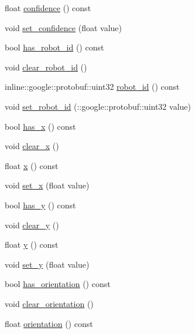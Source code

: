 \begin{DoxyCompactItemize}
\item 
float \hyperlink{class_s_s_l___detection_robot_a1d97bf539ab936970b87ef7227901244}{confidence} () const 
\item 
void \hyperlink{class_s_s_l___detection_robot_ad88046c782a1adaf687615e34f3e2872}{set\-\_\-confidence} (float value)
\item 
bool \hyperlink{class_s_s_l___detection_robot_a34dd202d20152a26ab7fd5260de88396}{has\-\_\-robot\-\_\-id} () const 
\item 
void \hyperlink{class_s_s_l___detection_robot_a0922ff5871a2a6c71b8ec5ad930418a4}{clear\-\_\-robot\-\_\-id} ()
\item 
inline\-::google\-::protobuf\-::uint32 \hyperlink{class_s_s_l___detection_robot_a15d7fb18efdd2a2fc62761cda6c3a3d4}{robot\-\_\-id} () const 
\item 
void \hyperlink{class_s_s_l___detection_robot_a73454e345ec7ecd1f456725fdd3848cd}{set\-\_\-robot\-\_\-id} (\-::google\-::protobuf\-::uint32 value)
\item 
bool \hyperlink{class_s_s_l___detection_robot_a7d2e964063b60363bbe580200c4aa8e1}{has\-\_\-x} () const 
\item 
void \hyperlink{class_s_s_l___detection_robot_a905b7fae49476432bb7a17dd3e7476cf}{clear\-\_\-x} ()
\item 
float \hyperlink{class_s_s_l___detection_robot_ab26732ef505b608cbf2066ed5398c04b}{x} () const 
\item 
void \hyperlink{class_s_s_l___detection_robot_a5e0ba522e724d9b10805ef4ad40d1461}{set\-\_\-x} (float value)
\item 
bool \hyperlink{class_s_s_l___detection_robot_a1c6405de09273755cf791446e8fd2a3a}{has\-\_\-y} () const 
\item 
void \hyperlink{class_s_s_l___detection_robot_a64b4708c9088a930d984e19ba3fc8c90}{clear\-\_\-y} ()
\item 
float \hyperlink{class_s_s_l___detection_robot_a3e8b20fa95d9274aa1dbd0478d0f92e7}{y} () const 
\item 
void \hyperlink{class_s_s_l___detection_robot_ae176823c7fdc07c1de51eb18c586dc4c}{set\-\_\-y} (float value)
\item 
bool \hyperlink{class_s_s_l___detection_robot_a34487c873a686b45e9fe71b52cb69278}{has\-\_\-orientation} () const 
\item 
void \hyperlink{class_s_s_l___detection_robot_acd977f29ddb42473dd55651f30db00c0}{clear\-\_\-orientation} ()
\item 
float \hyperlink{class_s_s_l___detection_robot_a9e90e0537ebd1ca97636053a72e30f1b}{orientation} () const 

\end{DoxyCompactItemize}
